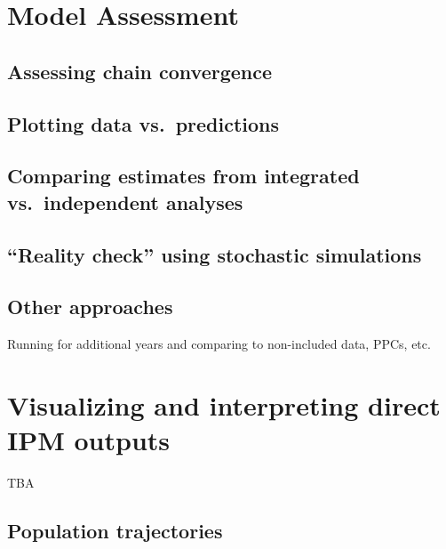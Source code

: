 \documentclass[
]{book}
\begin{document}
\hypertarget{ModelAssm}{%
\chapter{Model Assessment}\label{ModelAssm}}

\hypertarget{assessing-chain-convergence}{%
\section{Assessing chain convergence}\label{assessing-chain-convergence}}

\hypertarget{plotting-data-vs.-predictions}{%
\section{Plotting data vs.~predictions}\label{plotting-data-vs.-predictions}}

\hypertarget{comparing-estimates-from-integrated-vs.-independent-analyses}{%
\section{Comparing estimates from integrated vs.~independent analyses}\label{comparing-estimates-from-integrated-vs.-independent-analyses}}

\hypertarget{reality-check-using-stochastic-simulations}{%
\section{``Reality check'' using stochastic simulations}\label{reality-check-using-stochastic-simulations}}

\hypertarget{other-approaches}{%
\section{Other approaches}\label{other-approaches}}

Running for additional years and comparing to non-included data, PPCs, etc.

\hypertarget{ResultsViz}{%
\chapter{Visualizing and interpreting direct IPM outputs}\label{ResultsViz}}

TBA

\hypertarget{population-trajectories}{%
\section{Population trajectories}\label{population-trajectories}}
\end{document}
